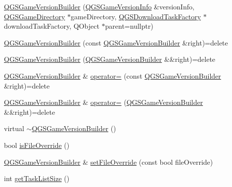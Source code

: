\begin{DoxyCompactItemize}
\item 
\mbox{\hyperlink{class_q_g_s_game_version_builder_a516faecd748c35d59e5e049c06d72f5b}{Q\+G\+S\+Game\+Version\+Builder}} (\mbox{\hyperlink{class_q_g_s_game_version_info}{Q\+G\+S\+Game\+Version\+Info}} \&version\+Info, \mbox{\hyperlink{class_q_g_s_game_directory}{Q\+G\+S\+Game\+Directory}} $\ast$game\+Directory, \mbox{\hyperlink{class_q_g_s_download_task_factory}{Q\+G\+S\+Download\+Task\+Factory}} $\ast$download\+Task\+Factory, Q\+Object $\ast$parent=nullptr)
\item 
\mbox{\hyperlink{class_q_g_s_game_version_builder_aaf62a4dc64e49091bf3f18e317d5b864}{Q\+G\+S\+Game\+Version\+Builder}} (const \mbox{\hyperlink{class_q_g_s_game_version_builder}{Q\+G\+S\+Game\+Version\+Builder}} \&right)=delete
\item 
\mbox{\hyperlink{class_q_g_s_game_version_builder_a72efb98f016173c2d6507f720f8b39d4}{Q\+G\+S\+Game\+Version\+Builder}} (\mbox{\hyperlink{class_q_g_s_game_version_builder}{Q\+G\+S\+Game\+Version\+Builder}} \&\&right)=delete
\item 
\mbox{\hyperlink{class_q_g_s_game_version_builder}{Q\+G\+S\+Game\+Version\+Builder}} \& \mbox{\hyperlink{class_q_g_s_game_version_builder_a2f09881d10b38897cf985703b511c35c}{operator=}} (const \mbox{\hyperlink{class_q_g_s_game_version_builder}{Q\+G\+S\+Game\+Version\+Builder}} \&right)=delete
\item 
\mbox{\hyperlink{class_q_g_s_game_version_builder}{Q\+G\+S\+Game\+Version\+Builder}} \& \mbox{\hyperlink{class_q_g_s_game_version_builder_a0d48f2dae983ddc31844e1099f7a5d35}{operator=}} (\mbox{\hyperlink{class_q_g_s_game_version_builder}{Q\+G\+S\+Game\+Version\+Builder}} \&\&right)=delete
\item 
virtual \mbox{\hyperlink{class_q_g_s_game_version_builder_a7b978c6c3f53acd238539d2799b25e3d}{$\sim$\+Q\+G\+S\+Game\+Version\+Builder}} ()
\item 
bool \mbox{\hyperlink{class_q_g_s_game_version_builder_a64ee9caa1bb2b78a1b3e09a1fd56aab8}{is\+File\+Override}} ()
\item 
\mbox{\hyperlink{class_q_g_s_game_version_builder}{Q\+G\+S\+Game\+Version\+Builder}} \& \mbox{\hyperlink{class_q_g_s_game_version_builder_a9a636c2ecc5daea969a946c69cbf402b}{set\+File\+Override}} (const bool file\+Override)
\item 
int \mbox{\hyperlink{class_q_g_s_game_version_builder_a344a93873726d030bee025a35970e62e}{get\+Task\+List\+Size}} ()
\end{DoxyCompactItemize}
